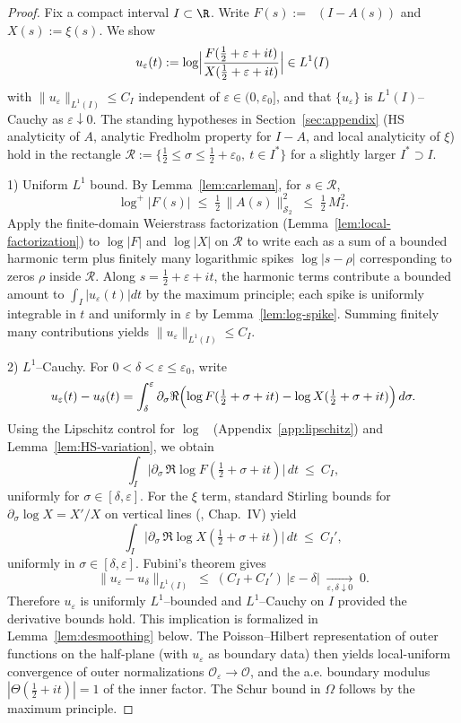 \documentclass[11pt]{article}
\theoremstyle{remark}
\newcommand{\HS}{\mathcal{S}_2}
\DeclareMathOperator{\dettwo}{det_2}
\begin{document}
\begin{proof}
Fix a compact interval $I\subset\R$. Write $F(s):=\dettwo(I-A(s))$ and $X(s):=\xi(s)$. We show
\[
 u_\varepsilon(t):=\log\Bigl|\frac{F(\tfrac12+\varepsilon+it)}{X(\tfrac12+\varepsilon+it)}\Bigr|\in L^1(I)
\]
with $\|u_\varepsilon\|_{L^1(I)}\le C_I$ independent of $\varepsilon\in(0,\varepsilon_0]$, and that $\{u_\varepsilon\}$ is $L^1(I)$–Cauchy as $\varepsilon\downarrow 0$. The standing hypotheses in Section~\ref{sec:appendix} (HS analyticity of $A$, analytic Fredholm property for $I-A$, and local analyticity of $\xi$) hold in the rectangle $\mathcal R:=\{\tfrac12\le\sigma\le\tfrac12+\varepsilon_0,\ t\in I^{\!*}\}$ for a slightly larger $I^{\!*}\supset I$.

1) Uniform $L^1$ bound. By Lemma~\ref{lem:carleman}, for $s\in\mathcal R$,
\[
 \log^+|F(s)|\;\le\;\tfrac12\,\|A(s)\|_{\HS}^2\;\le\;\tfrac12\,M_I^2.
\]
Apply the finite-domain Weierstrass factorization (Lemma~\ref{lem:local-factorization}) to $\log|F|$ and $\log|X|$ on $\mathcal R$ to write each as a sum of a bounded harmonic term plus finitely many logarithmic spikes $\log|s-\rho|$ corresponding to zeros $\rho$ inside $\mathcal R$. Along $s=\tfrac12+\varepsilon+it$, the harmonic terms contribute a bounded amount to $\int_I |u_\varepsilon(t)|dt$ by the maximum principle; each spike is uniformly integrable in $t$ and uniformly in $\varepsilon$ by Lemma~\ref{lem:log-spike}. Summing finitely many contributions yields $\|u_\varepsilon\|_{L^1(I)}\le C_I$.

2) $L^1$–Cauchy. For $0<\delta<\varepsilon\le\varepsilon_0$, write
\[
 u_\varepsilon(t)-u_\delta(t)
 = \int_{\delta}^{\varepsilon} \partial_\sigma \Re\Bigl(\log F(\tfrac12+\sigma+it)-\log X(\tfrac12+\sigma+it)\Bigr)\,d\sigma.
\]
Using the Lipschitz control for $\log\dettwo$ (Appendix~\ref{app:lipschitz}) and Lemma~\ref{lem:HS-variation}, we obtain
\[
 \int_I\bigl|\partial_\sigma\,\Re\log F(\tfrac12+\sigma+it)\bigr|\,dt\ \le\ C_I,
\]
uniformly for $\sigma\in[\delta,\varepsilon]$. For the $\xi$ term, standard Stirling bounds for $\partial_\sigma\log X= X'/X$ on vertical lines (\cite{TitchmarshZeta}, Chap.~IV) yield
\[
  \int_I\bigl|\partial_\sigma\,\Re\log X(\tfrac12+\sigma+it)\bigr|\,dt\ \le\ C_I',
\]
uniformly in $\sigma\in[\delta,\varepsilon]$. Fubini’s theorem gives
\[
 \|u_\varepsilon-u_\delta\|_{L^1(I)}\;\le\;(C_I+C_I')\,|\varepsilon-\delta|\;\xrightarrow[\varepsilon,\delta\downarrow 0]{}\;0.
\]
Therefore $u_\varepsilon$ is uniformly $L^1$–bounded and $L^1$–Cauchy on $I$ provided the derivative bounds hold. This implication is formalized in Lemma~\ref{lem:desmoothing} below. The Poisson–Hilbert representation of outer functions on the half-plane (with $u_\varepsilon$ as boundary data) then yields local-uniform convergence of outer normalizations $\mathcal O_\varepsilon\to \mathcal O$, and the a.e. boundary modulus $|\Theta(\tfrac12+it)|=1$ of the inner factor. The Schur bound in $\Omega$ follows by the maximum principle.
\end{proof}
\end{document}
